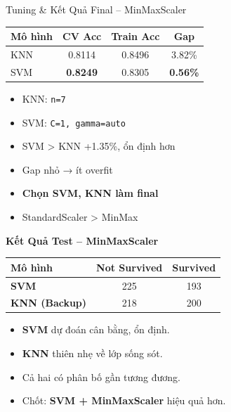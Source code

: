 \documentclass[
	11pt
]{beamer}
\begin{document}
\begin{frame}{Tuning \& Kết Quả Final -- MinMaxScaler}
	\centering
	
	\begin{tabular}{lccc}
		\toprule
		\textbf{Mô hình} & \textbf{CV Acc} & \textbf{Train Acc} & \textbf{Gap} \\
		\midrule
		KNN     & 0.8114 & 0.8496 & 3.82\% \\
		SVM     & \textbf{0.8249} & 0.8305 & \textbf{0.56\%} \\
		\bottomrule
	\end{tabular}
	
	\vspace{0.4em}
	
	\begin{itemize}
		\item KNN: \texttt{n=7}
		\item SVM: \texttt{C=1, gamma=auto}
		\item SVM > KNN +1.35\%, ổn định hơn
		\item Gap nhỏ → ít overfit
		\item \textbf{Chọn SVM, KNN làm final}
		\item StandardScaler > MinMax
	\end{itemize}
\end{frame}

\begin{frame}{\textbf{Kết Quả Test – MinMaxScaler}}
	
	\centering
	\small
	\begin{tabular}{lcc}
		\toprule
		\textbf{Mô hình} & \textbf{Not Survived} & \textbf{Survived} \\
		\midrule
		\textbf{SVM} & 225 & 193 \\
		\textbf{KNN (Backup)} & 218 & 200 \\
		\bottomrule
	\end{tabular}
	
	\vspace{0.6em}
	
	\begin{itemize}
		\item \textbf{SVM} dự đoán cân bằng, ổn định.  
		\item \textbf{KNN} thiên nhẹ về lớp sống sót.  
		\item Cả hai có phân bố gần tương đương.  
		\item Chốt: \textbf{SVM + MinMaxScaler} hiệu quả hơn.
	\end{itemize}
	
\end{frame}
\end{document}
